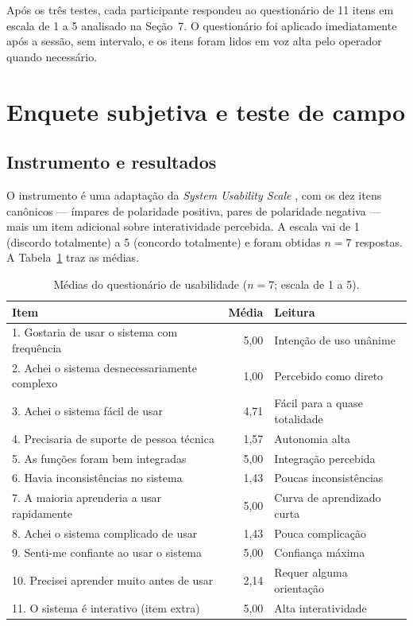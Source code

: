 \documentclass[12pt]{article}
\begin{document}
Após os três testes, cada participante respondeu ao questionário de 11 itens
em escala de 1 a 5 analisado na Seção~7. O questionário foi aplicado
imediatamente após a sessão, sem intervalo, e os itens foram lidos em voz
alta pelo operador quando necessário.

\section{Enquete subjetiva e teste de campo}

\subsection{Instrumento e resultados}

O instrumento é uma adaptação da \textit{System Usability Scale}
\cite{brooke1996}, com os dez itens canônicos --- ímpares de polaridade
positiva, pares de polaridade negativa --- mais um item adicional sobre
interatividade percebida. A escala vai de 1 (discordo totalmente) a 5
(concordo totalmente) e foram obtidas $n = 7$ respostas. A Tabela~\ref{tab3} traz as médias.

\begin{table}[ht]
\centering
\caption{Médias do questionário de usabilidade ($n = 7$; escala de 1 a 5).}
\label{tab3}
\footnotesize
\begin{tabular}{p{7.4cm}rp{3.4cm}}
\toprule
\textbf{Item} & \textbf{Média} & \textbf{Leitura} \\
\midrule
1. Gostaria de usar o sistema com frequência & 5,00 & Intenção de uso unânime \\
2. Achei o sistema desnecessariamente complexo & 1,00 & Percebido como direto \\
3. Achei o sistema fácil de usar & 4,71 & Fácil para a quase totalidade \\
4. Precisaria de suporte de pessoa técnica & 1,57 & Autonomia alta \\
5. As funções foram bem integradas & 5,00 & Integração percebida \\
6. Havia inconsistências no sistema & 1,43 & Poucas inconsistências \\
7. A maioria aprenderia a usar rapidamente & 5,00 & Curva de aprendizado curta \\
8. Achei o sistema complicado de usar & 1,43 & Pouca complicação \\
9. Senti-me confiante ao usar o sistema & 5,00 & Confiança máxima \\
10. Precisei aprender muito antes de usar & 2,14 & Requer alguma orientação \\
11. O sistema é interativo (item extra) & 5,00 & Alta interatividade \\
\bottomrule
\end{tabular}
\end{table}
\end{document}
